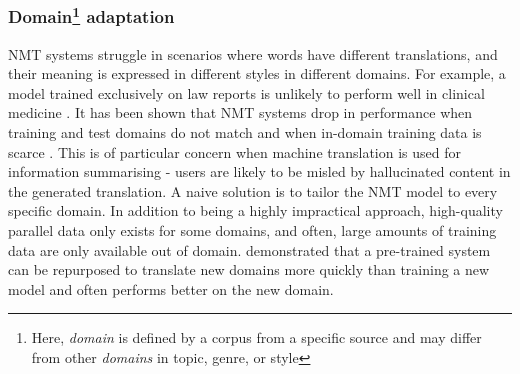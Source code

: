 \documentclass[11pt]{article}
\begin{document}
\subsubsection*{Domain\footnote{Here, \textit{domain} is defined by a corpus from a specific source and may differ from other \textit{domains} in topic, genre, or style} adaptation} \label{heading:domadapt} \vspace{-2mm}
NMT systems struggle in scenarios where words have different translations, and their meaning is expressed in different styles in different domains. For example, a model trained exclusively on law reports is unlikely to perform well in clinical medicine \citep{zhang-etal-2019-curriculum}.
It has been shown that NMT systems drop in performance when training and test domains do not match and when in-domain training data is scarce \citep{koehn-knowles-2017-six}. 
This is of particular concern when machine translation is used for information summarising - users are likely to be misled by hallucinated content in the generated translation.
A naive solution is to tailor the NMT model to every specific domain. In addition to being a highly impractical approach, high-quality parallel data only exists for some domains, and often, large amounts of training data are only available out of domain.
\cite{luong-etal-2015-effective} demonstrated that a pre-trained system can be repurposed to translate new domains more quickly than training a new model and often performs better on the new domain.
\end{document}
